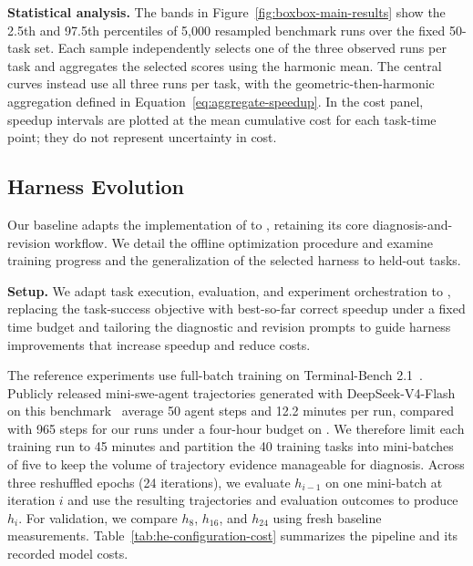 \textbf{Statistical analysis.}
\label{app:experiments-statistics}
The bands in Figure~\ref{fig:boxbox-main-results} show the 2.5th and 97.5th
percentiles of 5,000 resampled benchmark runs over the fixed 50-task set.
Each sample independently selects one of the three observed runs per task
and aggregates the selected scores using the harmonic mean.
The central curves instead use all three runs per task, with the
geometric-then-harmonic aggregation defined in
Equation~\ref{eq:aggregate-speedup}.
In the cost panel, speedup intervals are plotted at the mean cumulative
cost for each task-time point; they do not represent uncertainty in cost.

\subsection{Harness Evolution}
\label{app:experiments-he}

Our \he{} baseline adapts the implementation of \citet{wang2026harnessevolution} to \perfrace{}, retaining its core diagnosis-and-revision workflow. We detail the offline optimization procedure and examine training progress and the generalization of the selected harness to held-out tasks.

\textbf{Setup.} We adapt task execution, evaluation, and experiment orchestration to \perfrace{}, replacing the task-success objective with best-so-far correct speedup under a fixed time budget and tailoring the diagnostic and revision prompts to guide harness improvements that increase speedup and reduce costs.

The reference \he{} experiments use full-batch training on Terminal-Bench 2.1~\citep{wang2026harnessevolution}. Publicly released mini-swe-agent trajectories generated with DeepSeek-V4-Flash on this benchmark~\citep{kwok2026llmasaverifier} average 50 agent steps and 12.2 minutes per run, compared with 965 steps for our \frozen{} runs under a four-hour budget on \perfrace{}. We therefore limit each training run to 45 minutes and partition the 40 training tasks into mini-batches of five to keep the volume of trajectory evidence manageable for diagnosis. Across three reshuffled epochs (24 iterations), we evaluate $h_{i-1}$ on one mini-batch at iteration $i$ and use the resulting trajectories and evaluation outcomes to produce $h_i$. For validation, we compare $h_8$, $h_{16}$, and $h_{24}$ using fresh baseline measurements. Table~\ref{tab:he-configuration-cost} summarizes the \he{} pipeline and its recorded model costs.

